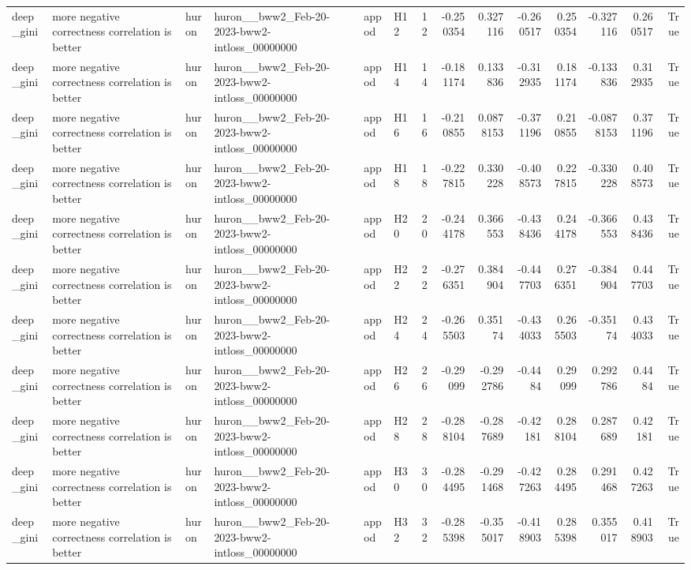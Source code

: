 \begin{longtable}{llllllrrrrrrrr}
deep\_gini & more negative correctness correlation is better & huron & huron\_\_bww2\_Feb-20-2023-bww2-intloss\_00000000 & appod & H12 & 12 & -0.250354 & 0.327116 & -0.260517 & 0.250354 & -0.327116 & 0.260517 & True \\
deep\_gini & more negative correctness correlation is better & huron & huron\_\_bww2\_Feb-20-2023-bww2-intloss\_00000000 & appod & H14 & 14 & -0.181174 & 0.133836 & -0.312935 & 0.181174 & -0.133836 & 0.312935 & True \\
deep\_gini & more negative correctness correlation is better & huron & huron\_\_bww2\_Feb-20-2023-bww2-intloss\_00000000 & appod & H16 & 16 & -0.210855 & 0.0878153 & -0.371196 & 0.210855 & -0.0878153 & 0.371196 & True \\
deep\_gini & more negative correctness correlation is better & huron & huron\_\_bww2\_Feb-20-2023-bww2-intloss\_00000000 & appod & H18 & 18 & -0.227815 & 0.330228 & -0.408573 & 0.227815 & -0.330228 & 0.408573 & True \\
deep\_gini & more negative correctness correlation is better & huron & huron\_\_bww2\_Feb-20-2023-bww2-intloss\_00000000 & appod & H20 & 20 & -0.244178 & 0.366553 & -0.438436 & 0.244178 & -0.366553 & 0.438436 & True \\
deep\_gini & more negative correctness correlation is better & huron & huron\_\_bww2\_Feb-20-2023-bww2-intloss\_00000000 & appod & H22 & 22 & -0.276351 & 0.384904 & -0.447703 & 0.276351 & -0.384904 & 0.447703 & True \\
deep\_gini & more negative correctness correlation is better & huron & huron\_\_bww2\_Feb-20-2023-bww2-intloss\_00000000 & appod & H24 & 24 & -0.265503 & 0.35174 & -0.434033 & 0.265503 & -0.35174 & 0.434033 & True \\
deep\_gini & more negative correctness correlation is better & huron & huron\_\_bww2\_Feb-20-2023-bww2-intloss\_00000000 & appod & H26 & 26 & -0.29099 & -0.292786 & -0.4484 & 0.29099 & 0.292786 & 0.4484 & True \\
deep\_gini & more negative correctness correlation is better & huron & huron\_\_bww2\_Feb-20-2023-bww2-intloss\_00000000 & appod & H28 & 28 & -0.288104 & -0.287689 & -0.42181 & 0.288104 & 0.287689 & 0.42181 & True \\
deep\_gini & more negative correctness correlation is better & huron & huron\_\_bww2\_Feb-20-2023-bww2-intloss\_00000000 & appod & H30 & 30 & -0.284495 & -0.291468 & -0.427263 & 0.284495 & 0.291468 & 0.427263 & True \\
deep\_gini & more negative correctness correlation is better & huron & huron\_\_bww2\_Feb-20-2023-bww2-intloss\_00000000 & appod & H32 & 32 & -0.285398 & -0.355017 & -0.418903 & 0.285398 & 0.355017 & 0.418903 & True \\

\end{longtable}
